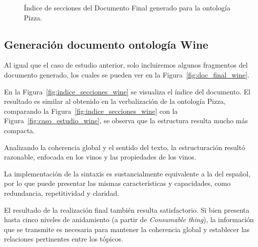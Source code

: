 \begin{figure}
\begin{multicols}{2}
\small{
\begin{figure}[H]
\end{figure}

\begin{figure}[H]
\end{figure}
}
\end{multicols}
\caption{Índice de secciones del Documento Final generado para la ontología Pizza.}
\label{fig:indice_secciones_pizza}
\end{figure}


\subsection{Generación documento ontología Wine}
Al igual que el caso de estudio anterior, solo incluiremos algunos fragmentos del documento generado, los cuales se pueden ver en la Figura~\ref{fig:doc_final_wine}.

En la Figura~\ref{fig:indice_secciones_wine} se visualiza el índice del documento. El resultado es similar al obtenido en la verbalización de la ontología Pizza, comparando la Figura~\ref{fig:indice_secciones_wine} con la Figura~\ref{fig:caso_estudio_wine}, se observa que la estructura resulta mucho más compacta.

Analizando la coherencia global y el sentido del texto, la estructuración resultó razonable, enfocada en los vinos y las propiedades de los vinos.

La implementación de la sintaxis es sustancialmente equivalente a la del español, por lo que puede presentar las mismas características y capacidades, como redundancia, repetitividad y claridad. 

El resultado de la realización final también resulta satisfactorio. Si bien presenta hasta cinco niveles de anidamiento (a partir de \emph{Consumable thing}), la información que se transmite es necesaria para mantener la coherencia global y establecer las relaciones pertinentes entre los tópicos.

